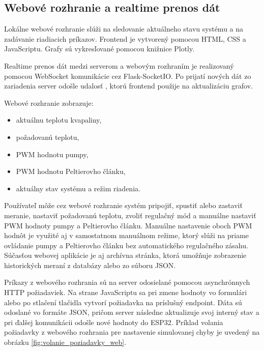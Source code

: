 \begin{figure}[H]
    \centering
    \label{fig:def_endpoint}
\end{figure}

\subsection{Webové rozhranie a realtime prenos dát}

Lokálne webové rozhranie slúži na sledovanie aktuálneho stavu systému a na zadávanie 
riadiacich príkazov. Frontend je vytvorený pomocou HTML, CSS a JavaScriptu. 
Grafy sú vykresľované pomocou knižnice Plotly.

Realtime prenos dát medzi serverom a webovým rozhraním je realizovaný pomocou WebSocket 
komunikácie cez Flask-SocketIO. Po prijatí nových dát zo zariadenia server odošle udalosť 
, ktorú frontend použije na aktualizáciu grafov.

Webové rozhranie zobrazuje:

\begin{itemize}
    \item aktuálnu teplotu kvapaliny,
    \item požadovanú teplotu,
    \item PWM hodnotu pumpy,
    \item PWM hodnotu Peltierovho článku,
    \item aktuálny stav systému a režim riadenia.
\end{itemize}

Používateľ môže cez webové rozhranie systém pripojiť, spustiť alebo zastaviť meranie, 
nastaviť požadovanú teplotu, zvoliť regulačný mód a manuálne nastaviť PWM hodnoty pumpy a 
Peltierovho článku. Manuálne nastavenie oboch PWM hodnôt je využité aj v samostatnom 
manuálnom režime, ktorý slúži na priame ovládanie pumpy a Peltierovho článku bez automatického 
regulačného zásahu. Súčasťou webovej aplikácie je aj archívna stránka, ktorá umožňuje 
zobrazenie historických meraní z databázy alebo zo súboru JSON.

Príkazy z webového rozhrania sú na server odosielané pomocou asynchrónnych HTTP požiadaviek. 
Na strane JavaScriptu sa pri zmene hodnoty vo formulári alebo po stlačení tlačidla vytvorí 
požiadavka na príslušný endpoint. Dáta sú odoslané vo formáte JSON, pričom server následne 
aktualizuje svoj interný stav a pri ďalšej komunikácii odošle nové hodnoty do ESP32. Príklad 
volania požiadavky z webového rozhrania pre nastavenie simulovanej chyby je uvedený na obrázku 
\ref{fig:volanie_poziadavky_web}.

